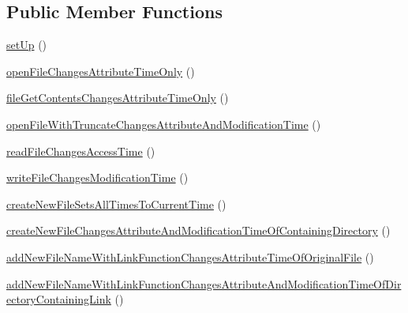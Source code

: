 \subsection*{Public Member Functions}
\begin{DoxyCompactItemize}
\item 
\mbox{\hyperlink{classorg_1_1bovigo_1_1vfs_1_1vfs_stream_wrapper_file_times_test_case_a0bc688732d2b3b162ffebaf7812e78da}{set\+Up}} ()
\item 
\mbox{\hyperlink{classorg_1_1bovigo_1_1vfs_1_1vfs_stream_wrapper_file_times_test_case_a74e1e838599473c45156ef4c68040ada}{open\+File\+Changes\+Attribute\+Time\+Only}} ()
\item 
\mbox{\hyperlink{classorg_1_1bovigo_1_1vfs_1_1vfs_stream_wrapper_file_times_test_case_a43b022baabad384907318fd21a215fe8}{file\+Get\+Contents\+Changes\+Attribute\+Time\+Only}} ()
\item 
\mbox{\hyperlink{classorg_1_1bovigo_1_1vfs_1_1vfs_stream_wrapper_file_times_test_case_a4ef0cae52a59e47c9b0c6050c4f4b76c}{open\+File\+With\+Truncate\+Changes\+Attribute\+And\+Modification\+Time}} ()
\item 
\mbox{\hyperlink{classorg_1_1bovigo_1_1vfs_1_1vfs_stream_wrapper_file_times_test_case_a9f08dcdac224a2f9642eb45173b16724}{read\+File\+Changes\+Access\+Time}} ()
\item 
\mbox{\hyperlink{classorg_1_1bovigo_1_1vfs_1_1vfs_stream_wrapper_file_times_test_case_a27796a05f7734b08f647fa988c2f7e37}{write\+File\+Changes\+Modification\+Time}} ()
\item 
\mbox{\hyperlink{classorg_1_1bovigo_1_1vfs_1_1vfs_stream_wrapper_file_times_test_case_a6ae0093524893cc46a8ed6ea472450fe}{create\+New\+File\+Sets\+All\+Times\+To\+Current\+Time}} ()
\item 
\mbox{\hyperlink{classorg_1_1bovigo_1_1vfs_1_1vfs_stream_wrapper_file_times_test_case_a2a8603b21507a7501fcc1d3a91e0b517}{create\+New\+File\+Changes\+Attribute\+And\+Modification\+Time\+Of\+Containing\+Directory}} ()
\item 
\mbox{\hyperlink{classorg_1_1bovigo_1_1vfs_1_1vfs_stream_wrapper_file_times_test_case_ac3abb7011640b6c1081695b6fb390684}{add\+New\+File\+Name\+With\+Link\+Function\+Changes\+Attribute\+Time\+Of\+Original\+File}} ()
\item 
\mbox{\hyperlink{classorg_1_1bovigo_1_1vfs_1_1vfs_stream_wrapper_file_times_test_case_a9eb8a45dc12a1dbc990e9a93f75a4511}{add\+New\+File\+Name\+With\+Link\+Function\+Changes\+Attribute\+And\+Modification\+Time\+Of\+Directory\+Containing\+Link}} ()

\end{DoxyCompactItemize}
